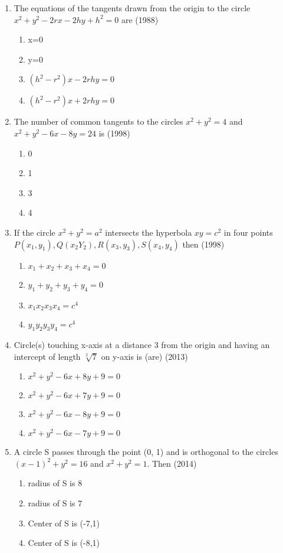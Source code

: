 \documentclass[12pt]{article}
\begin{document}
\begin{enumerate}
\item The equations of the tangents drawn from the origin to the circle $x^2+y^2-2rx-2hy+h^2=0$ are (1988)
\begin{enumerate}
\item x=0
\item y=0
\item $(h^2-r^2)x-2rhy=0$
\item $(h^2-r^2)x+2rhy=0$ 
\end{enumerate}
\item The number of common tangents to the circles $x^2+y^2=4$ and $x^2+y^2-6x-8y=24$ is (1998)
\begin{enumerate}
\item 0
\item 1
\item 3
\item 4
\end{enumerate}
\item If the circle $x^2+y^2=a^2$ intersects the hyperbola $xy=c^2$ in four points $P(x_1,y_1), Q(x_2 Y_2), R(x_3 ,y_3), S(x_4,y_4)$ then (1998)
\begin{enumerate}
\item $x_1+x_2+x_3+x_4=0$
\item $y_1+y_2+y_3+y_4=0$
\item $x_1x_2x_3x_4=c^4$
\item $y_1y_2y_3y_4=c^4$
\end{enumerate}
\item Circle(s) touching x-axis at a distance 3 from the origin and having an intercept of length $\sqrt[2]{7}$ on y-axis is (are) (2013)
\begin{enumerate}
\item $x^2+y^2-6x+8y+9=0$
\item $x^2+y^2-6x+7y+9=0$
\item $x^2+y^2-6x-8y+9=0$
\item $x^2+y^2-6x-7y+9=0$
\end{enumerate}
\item A circle S passes through the point (0, 1) and is orthogonal to the circles $(x- 1)^2+y^2=16$ and $x^2+y^2=1$. Then (2014)
\begin{enumerate}
\item radius of S is 8
\item radius of S is 7
\item Center of S is (-7,1)
\item Center of S is (-8,1)

\end{enumerate}
\end{enumerate}
\end{document}
